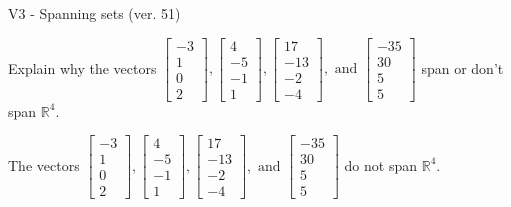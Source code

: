 \begin{exercise}
  \begin{exerciseTitle}V3 - Spanning sets (ver. 51)\end{exerciseTitle}
  \begin{exerciseStatement}
    Explain why the vectors \(\left[\begin{array}{r}
-3 \\
1 \\
0 \\
2
\end{array}\right] , \left[\begin{array}{r}
4 \\
-5 \\
-1 \\
1
\end{array}\right] , \left[\begin{array}{r}
17 \\
-13 \\
-2 \\
-4
\end{array}\right] , \text{ and } \left[\begin{array}{r}
-35 \\
30 \\
5 \\
5
\end{array}\right]\) span or don't span \(\mathbb{R}^4\). 
	


  \end{exerciseStatement}
  \begin{exerciseAnswer}
   The vectors \(\left[\begin{array}{r}
-3 \\
1 \\
0 \\
2
\end{array}\right] , \left[\begin{array}{r}
4 \\
-5 \\
-1 \\
1
\end{array}\right] , \left[\begin{array}{r}
17 \\
-13 \\
-2 \\
-4
\end{array}\right] , \text{ and } \left[\begin{array}{r}
-35 \\
30 \\
5 \\
5
\end{array}\right]\) 
  	 do not  
	span \(\mathbb{R}^4\).
  


  \end{exerciseAnswer}
\end{exercise}